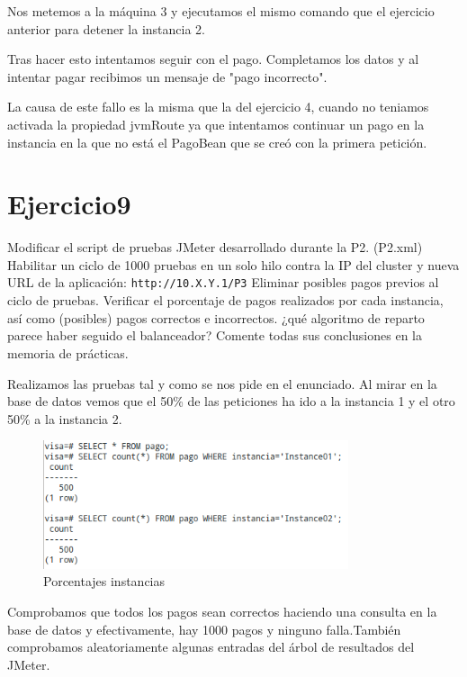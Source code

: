 \documentclass[a4paper, 10pt]{article}
\begin{document}
Nos metemos a la máquina 3 y ejecutamos el mismo comando que el ejercicio anterior para detener la instancia 2.

Tras hacer esto intentamos seguir con el pago. Completamos los datos y al intentar pagar recibimos un mensaje de "pago incorrecto".

La causa de este fallo es la misma que la del ejercicio 4, cuando no teniamos activada la propiedad jvmRoute ya que intentamos continuar un pago en la instancia en la que no está el PagoBean que se creó con la primera petición.
\newpage
\section{Ejercicio9}
\begin{mdframed}
	Modificar el script de pruebas JMeter desarrollado durante la P2. (P2.xml) Habilitar un ciclo de
	1000 pruebas en un solo hilo contra la IP del cluster y nueva URL de la aplicación:
	\texttt{http://10.X.Y.1/P3}
	Eliminar posibles pagos previos al ciclo de pruebas. Verificar el porcentaje de pagos realizados por cada
	instancia, así como (posibles) pagos correctos e incorrectos. ¿qué algoritmo de reparto parece haber
	seguido el balanceador? Comente todas sus conclusiones en la memoria de prácticas. 
\end{mdframed}

Realizamos las pruebas tal y como se nos pide en el enunciado.
Al mirar en la base de datos vemos que el 50\% de las peticiones ha ido a la instancia 1 y el otro 50\% a la instancia 2.

\begin{figure}[hbtp]
	\centering
	\includegraphics[width=0.8\textwidth]{../../P3/pantallazos/ej9_bd.png}
	\caption { Porcentajes instancias }
\end{figure}

Comprobamos que todos los pagos sean correctos haciendo una consulta en la base de datos y efectivamente, hay 1000 pagos y ninguno falla.También comprobamos aleatoriamente algunas entradas del árbol de resultados del JMeter.
\end{document}
